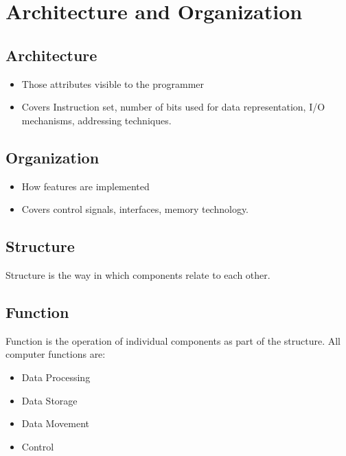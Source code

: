 \documentclass[9pt,twocolumn]{article}
\begin{document}
\section*{Architecture and Organization}
  \subsection*{Architecture}
    \begin{itemize}
      \item Those attributes visible to the programmer
      \item Covers Instruction set, number of bits used for data representation, I/O mechanisms, addressing techniques.
    \end{itemize}

  \subsection*{Organization}
    \begin{itemize}
      \item How features are implemented
      \item Covers control signals, interfaces, memory technology.
    \end{itemize}

  \subsection*{Structure}
    Structure is the way in which components relate to each other.

  \subsection*{Function}
    Function is the operation of individual components as part of the structure.
    All computer functions are:
    \begin{itemize}
      \item Data Processing
      \item Data Storage
      \item Data Movement
      \item Control
    \end{itemize}
\end{document}
